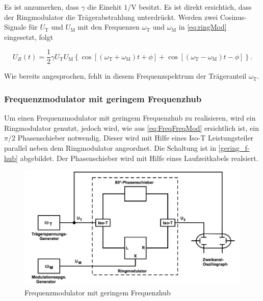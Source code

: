 \noindent Es ist anzumerken, dass $\gamma$ die Einehit $1 / \text{V}$ besitzt. Es ist direkt ersichtich, dass der Ringmodulator die Trägerabstrahlung unterdrückt. Werden zwei Cosinus-Signale für $U_\text{T}$ und $U_\text{M}$ mit den Frequenzen $\omega_\text{T}$ und $\omega_\text{M}$ in \ref{eq:ringMod} eingesetzt, folgt

\begin{equation}
U_R(t) = \frac{1}{2} \gamma U_\text{T} U_\text{M}  \left\{ \cos\left[(\omega_\text{T} + \omega_\text{M})t + \phi\right] + \cos\left[(\omega_\text{T} - \omega_\text{M})t - \phi \right] \right\}.
\end{equation}

\noindent Wie bereits angesprochen, fehlt in diesem Frequenzspektrum der Trägeranteil $\omega_\text{T}$.

\FloatBarrier

\subsubsection{Frequenzmodulator mit geringem Frequenzhub}
Um einen Frequenzmodulator mit geringem Frequenzhub zu realisieren, wird ein Ringmodulator genutzt, jedoch wird, wie aus \autoref{eq:FreqFreqMod} ersichtlich ist, ein $\pi/2$ Phasenschieber notwendig. Dieser wird mit Hilfe eines Iso-T Leistungsteiler parallel neben dem Ringmodulator angeordnet. Die Schaltung ist in \autoref{gering_f-hub} abgebildet. Der Phasenschieber wird mit Hilfe eines Laufzeitkabels realsiert.

\begin{figure}
	\centering
	\includegraphics[width=\textwidth]{img/Abb7.png}
	\caption{Frequenzmodulator mit geringem Frequenzhub \cite{FP}}
	\label{gering_f-hub}
\end{figure}

\FloatBarrier


